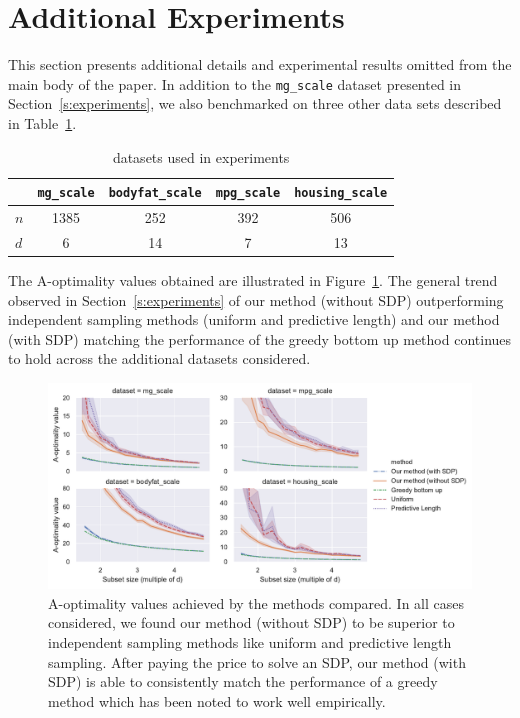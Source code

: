 \section*{Additional Experiments}

This section presents additional details and experimental results omitted from
the main body of the paper. In addition to the \texttt{mg\_scale} dataset presented in
Section~\ref{s:experiments}, we also benchmarked on three other data sets
described in Table~\ref{tab:libsvm-datasets}.
\begin{table}[ht]
    \centering
    \caption{\cite{libsvm} datasets used in experiments}
    \label{tab:libsvm-datasets}
    \begin{tabular}[t]{lcccc}
        \toprule
        & \texttt{mg\_scale} & \texttt{bodyfat\_scale} & \texttt{mpg\_scale} & \texttt{housing\_scale} \\
        \midrule
        $n$ & 1385 & 252 & 392 & 506 \\
        $d$ & 6 & 14 & 7 & 13\\
        \bottomrule
    \end{tabular}
\end{table}

The A-optimality values obtained are illustrated in Figure~\ref{f:obj-grid}.
The general trend observed in Section~\ref{s:experiments} of our method
(without SDP) outperforming independent sampling methods (uniform and
predictive length) and our method (with SDP) matching the performance of the
greedy bottom up method continues to hold across the additional datasets considered.

\begin{figure}[htpb]
    \centering
    \includegraphics[width=\textwidth]{bayesian_figures/obj_grid.pdf}
    \caption{A-optimality values achieved by the methods compared. In all cases
        considered, we found our method (without SDP) to be superior to independent
        sampling methods like uniform and predictive length sampling. After paying the price
        to solve an SDP, our method (with SDP) is able to consistently match the performance
        of a greedy method which has been noted
        \cite{chamon2017approximate} to work well empirically.}
    \label{f:obj-grid}
\end{figure}

